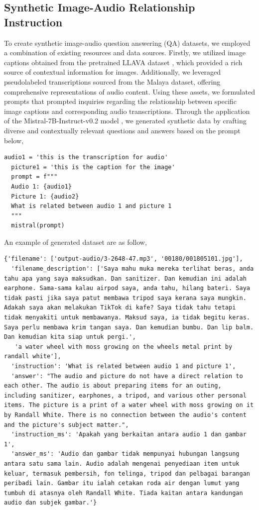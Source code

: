 \documentclass[preprint]{article}
\begin{document}
\subsection{Synthetic Image-Audio Relationship Instruction}

To create synthetic image-audio question answering (QA) datasets, we employed a combination of existing resources and data sources. Firstly, we utilized image captions obtained from the pretrained LLAVA dataset \cite{liu2023visual}, which provided a rich source of contextual information for images. Additionally, we leveraged pseudolabeled transcriptions sourced from the Malaya dataset, offering comprehensive representations of audio content. Using these assets, we formulated prompts that prompted inquiries regarding the relationship between specific image captions and corresponding audio transcriptions. Through the application of the Mistral-7B-Instruct-v0.2 model \cite{jiang2023mistral}, we generated synthetic data by crafting diverse and contextually relevant questions and answers based on the prompt below,

\begin{lstlisting}[breaklines=true]
  audio1 = 'this is the transcription for audio'
  picture1 = 'this is the caption for the image'
  prompt = f"""
  Audio 1: {audio1} 
  Picture 1: {audio2}
  What is related between audio 1 and picture 1
  """
  mistral(prompt)
\end{lstlisting}

An example of generated dataset are as follow,

\begin{lstlisting}[breaklines=true]
  {'filename': ['output-audio/3-2648-47.mp3', '00180/001805101.jpg'],
  'filename_description': ['Saya mahu muka mereka terlihat beras, anda tahu apa yang saya maksudkan. Dan sanitizer. Dan kemudian ini adalah earphone. Sama-sama kalau airpod saya, anda tahu, hilang bateri. Saya tidak pasti jika saya patut membawa tripod saya kerana saya mungkin. Adakah saya akan melakukan TikTok di kafe? Saya tidak tahu tetapi tidak menyakiti untuk membawanya. Maksud saya, ia tidak begitu keras. Saya perlu membawa krim tangan saya. Dan kemudian bumbu. Dan lip balm. Dan kemudian kita siap untuk pergi.',
   'a water wheel with moss growing on the wheels metal print by randall white'],
  'instruction': 'What is related between audio 1 and picture 1',
  'answer': "The audio and picture do not have a direct relation to each other. The audio is about preparing items for an outing, including sanitizer, earphones, a tripod, and various other personal items. The picture is a print of a water wheel with moss growing on it by Randall White. There is no connection between the audio's content and the picture's subject matter.",
  'instruction_ms': 'Apakah yang berkaitan antara audio 1 dan gambar 1',
  'answer_ms': 'Audio dan gambar tidak mempunyai hubungan langsung antara satu sama lain. Audio adalah mengenai penyediaan item untuk keluar, termasuk pembersih, fon telinga, tripod dan pelbagai barangan peribadi lain. Gambar itu ialah cetakan roda air dengan lumut yang tumbuh di atasnya oleh Randall White. Tiada kaitan antara kandungan audio dan subjek gambar.'}
 
\end{lstlisting}
\end{document}
